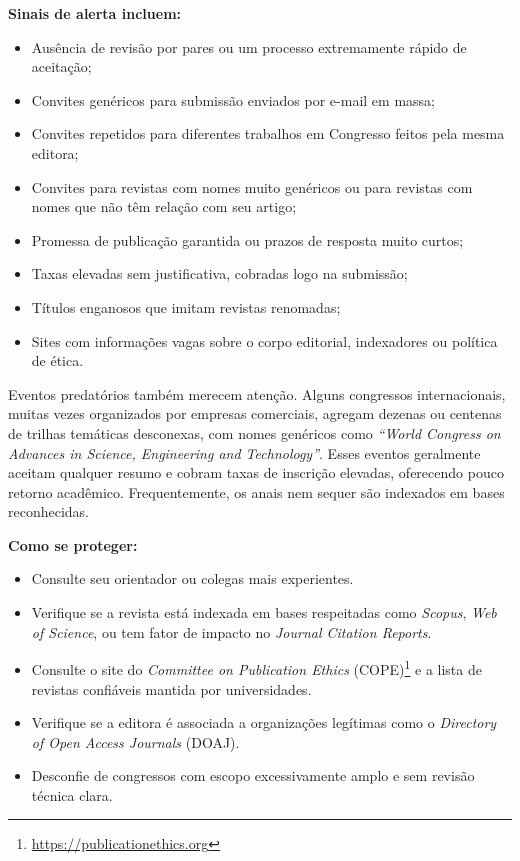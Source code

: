 \textbf{Sinais de alerta incluem:}
\begin{itemize}
  \item Ausência de revisão por pares ou um processo extremamente rápido de aceitação;
  \item Convites genéricos para submissão enviados por e-mail em massa;
  \item Convites repetidos para diferentes trabalhos em Congresso feitos pela mesma editora;
  \item Convites para revistas com nomes muito genéricos ou para revistas com nomes que não têm relação com seu artigo;
  \item Promessa de publicação garantida ou prazos de resposta muito curtos;
  \item Taxas elevadas sem justificativa, cobradas logo na submissão;
  \item Títulos enganosos que imitam revistas renomadas;
  \item Sites com informações vagas sobre o corpo editorial, indexadores ou política de ética.
\end{itemize}

Eventos predatórios também merecem atenção. Alguns congressos internacionais, muitas vezes organizados por empresas comerciais, agregam dezenas ou centenas de trilhas temáticas desconexas, com nomes genéricos como \textit{``World Congress on Advances in Science, Engineering and Technology''}. 
Esses eventos geralmente aceitam qualquer resumo e cobram taxas de inscrição elevadas, oferecendo pouco retorno acadêmico. Frequentemente, os anais nem sequer são indexados em bases reconhecidas.

\textbf{Como se proteger:}
\begin{itemize}
  \item Consulte seu orientador ou colegas mais experientes.
  \item Verifique se a revista está indexada em bases respeitadas como \textit{Scopus}, \textit{Web of Science}, ou tem fator de impacto no \textit{Journal Citation Reports}.
  \item Consulte o site do \textit{Committee on Publication Ethics} (COPE)\footnote{\url{https://publicationethics.org}} e a lista de revistas confiáveis mantida por universidades.
  \item Verifique se a editora é associada a organizações legítimas como o \textit{Directory of Open Access Journals} (DOAJ).
  \item Desconfie de congressos com escopo excessivamente amplo e sem revisão técnica clara.
\end{itemize}

